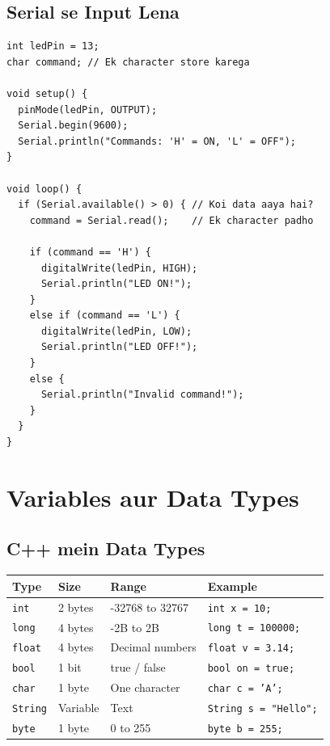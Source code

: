 \documentclass[12pt,a4paper]{article}
\begin{document}
\subsection{Serial se Input Lena}

\begin{tcolorbox}[codebox=Example 8: Computer se LED Control karo]
\begin{lstlisting}
int ledPin = 13;
char command; // Ek character store karega

void setup() {
  pinMode(ledPin, OUTPUT);
  Serial.begin(9600);
  Serial.println("Commands: 'H' = ON, 'L' = OFF");
}

void loop() {
  if (Serial.available() > 0) { // Koi data aaya hai?
    command = Serial.read();    // Ek character padhо

    if (command == 'H') {
      digitalWrite(ledPin, HIGH);
      Serial.println("LED ON!");
    }
    else if (command == 'L') {
      digitalWrite(ledPin, LOW);
      Serial.println("LED OFF!");
    }
    else {
      Serial.println("Invalid command!");
    }
  }
}
\end{lstlisting}
\end{tcolorbox}

\newpage

\section{Variables aur Data Types}

\subsection{C++ mein Data Types}

\begin{center}
\begin{tabular}{|l|l|l|l|}
\hline
\rowcolor{arduinoBlue!20}
\textbf{Type} & \textbf{Size} & \textbf{Range} & \textbf{Example} \\
\hline
\texttt{int} & 2 bytes & -32768 to 32767 & \texttt{int x = 10;} \\
\hline
\texttt{long} & 4 bytes & -2B to 2B & \texttt{long t = 100000;} \\
\hline
\texttt{float} & 4 bytes & Decimal numbers & \texttt{float v = 3.14;} \\
\hline
\texttt{bool} & 1 bit & true / false & \texttt{bool on = true;} \\
\hline
\texttt{char} & 1 byte & One character & \texttt{char c = 'A';} \\
\hline
\texttt{String} & Variable & Text & \texttt{String s = "Hello";} \\
\hline
\texttt{byte} & 1 byte & 0 to 255 & \texttt{byte b = 255;} \\
\hline
\end{tabular}
\end{center}
\end{document}
